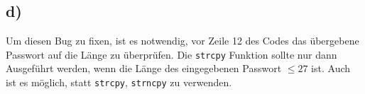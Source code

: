 \documentclass[]{scrreprt}
\begin{document}
\subsection*{d)}
Um diesen Bug zu fixen, ist es notwendig, vor Zeile 12 des Codes das übergebene Passwort auf die Länge zu überprüfen. Die \texttt{strcpy} Funktion sollte nur dann Ausgeführt werden, wenn die Länge des eingegebenen Passwort $\leq 27$ ist.
Auch ist es möglich, statt \texttt{strcpy}, \texttt{strncpy} zu verwenden.
	
\end{document}
